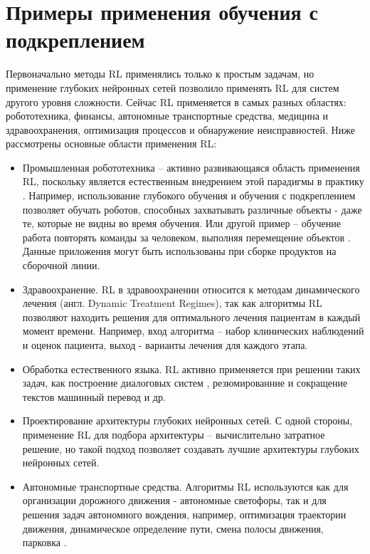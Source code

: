 \section{Примеры применения обучения с подкреплением}
Первоначально методы RL применялись только к простым задачам, но применение глубоких нейронных сетей позволило применять RL для систем другого уровня сложности. Сейчас RL применяется в самых разных областях: робототехника, финансы, автономные транспортные средства, медицина и здравоохранения, оптимизация процессов и обнаружение неисправностей. Ниже рассмотрены основные области применения RL:
\begin{itemize}[]
	\item Промышленная робототехника -- активно развивающаяся область применения RL, поскольку является естественным внедрением этой парадигмы в практику \cite{kober2013reinforcement}.
	Например, использование глубокого обучения и обучения с подкреплением позволяет обучать роботов, способных захватывать различные объекты - даже те, которые не видны во время обучения. Или другой пример -- обучение работа повторять команды за человеком, выполняя перемещение объектов \cite{ml3}. Данные приложения могут быть использованы при сборке продуктов на сборочной линии. 
	
	
	\item Здравоохранение. RL в здравоохранении относится к методам динамического лечения (англ. Dynamic Treatment Regimes), так как алгоритмы RL позволяют находить решения для оптимального лечения пациентам в каждый момент времени. Например, вход алгоритма  -- набор клинических наблюдений и оценок пациента, выход - варианты лечения для каждого этапа.\cite{yu2019reinforcement}
	
	\item Обработка естественного языка. RL активно применяется при решении таких задач, как построение диалоговых систем \cite{li2016deep}, резюмированние и сокращение текстов \cite{paulus2017deep} машинный перевод и др.
	
	\item Проектирование архитектуры глубоких нейронных сетей. С одной стороны, применение RL для подбора архитектуры -- вычислительно затратное решение, но такой подход позволяет создавать лучшие архитектуры глубоких нейронных сетей.
	
	\item Автономные транспортные средства. Алгоритмы RL используются как для организации дорожного движения - автономные светофоры, так и для решения задач автономного вождения, например, оптимизация траектории движения, динамическое определение пути, смена полосы движения, парковка \cite{talpaert2019exploring}.
	

\end{itemize}
